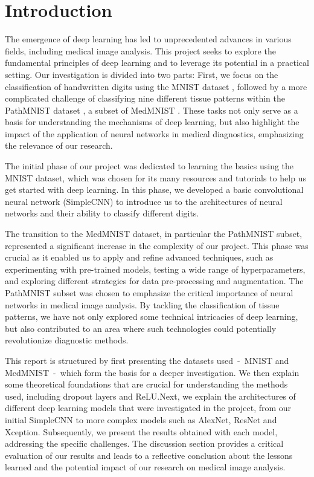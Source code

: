 \section{Introduction}\label{intro}


The emergence of deep learning has led to unprecedented advances in various fields, including medical image analysis. This project seeks to explore the fundamental principles of deep learning and to leverage its potential in a practical setting. Our investigation is divided into two parts: First, we focus on the classification of handwritten digits using the MNIST dataset \citep{deng2012mnist}, followed by a more complicated challenge of classifying nine different tissue patterns within the PathMNIST dataset \citep{kather2018, kather2019}, a subset of MedMNIST \citep{medmnistv1}. These tasks not only serve as a basis for understanding the mechanisms of deep learning, but also highlight the impact of the application of neural networks in medical diagnostics, emphasizing the relevance of our research.

The initial phase of our project was dedicated to learning the basics using the MNIST dataset, which was chosen for its many resources and tutorials to help us get started with deep learning. In this phase, we developed a basic convolutional neural network (SimpleCNN) to introduce us to the architectures of neural networks and their ability to classify different digits.

The transition to the MedMNIST dataset, in particular the PathMNIST subset, represented a significant increase in the complexity of our project. This phase was crucial as it enabled us to apply and refine advanced techniques, such as experimenting with pre-trained models, testing a wide range of hyperparameters, and exploring different strategies for data pre-processing and augmentation. The PathMNIST subset was chosen to emphasize the critical importance of neural networks in medical image analysis. By tackling the classification of tissue patterns, we have not only explored some technical intricacies of deep learning, but also contributed to an area where such technologies could potentially revolutionize diagnostic methods.

This report is structured by first presenting the datasets used~-~MNIST and MedMNIST~-~which form the basis for a deeper investigation. We then explain some theoretical foundations that are crucial for understanding the methods used, including dropout layers and ReLU.\@ Next, we explain the architectures of different deep learning models that were investigated in the project, from our initial SimpleCNN to more complex models such as AlexNet, ResNet and Xception. Subsequently, we present the results obtained with each model, addressing the specific challenges. The discussion section provides a critical evaluation of our results and leads to a reflective conclusion about the lessons learned and the potential impact of our research on medical image analysis.


